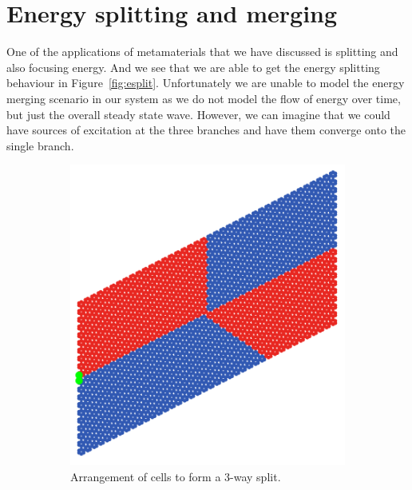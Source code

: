 \section{Energy splitting and merging}
One of the applications of metamaterials that we have discussed is splitting
and also focusing energy.\cite{toposplit,diremi,antennasol} And we see that we
are able to get the energy splitting behaviour in Figure~\ref{fig:esplit}.
Unfortunately we are unable to model the energy merging scenario in our system
as we do not model the flow of energy over time, but just the overall steady
state wave. However, we can imagine that we could have sources of excitation at
the three branches and have them converge onto the single branch.

\begin{figure}[!h]
\centering
\begin{subfigure}[b]{.5\textwidth}
  \centering
  \includegraphics[width=0.8\linewidth]{imgs/esplitarr.png}
  \caption{Arrangement of cells to form a 3-way split.}
  \label{fig:sub1}
\end{subfigure}%
\begin{subfigure}[b]{.5\textwidth}
  \centering

\end{subfigure}
\end{figure}
